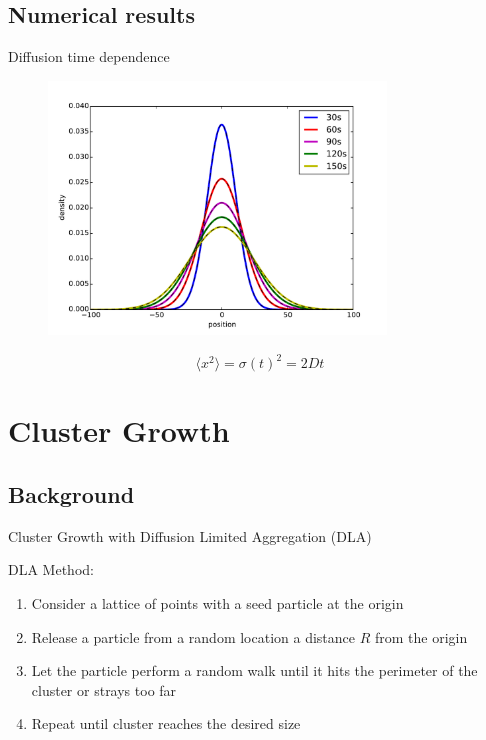 \documentclass{beamer}
\begin{document}
\subsection{Numerical results}

\begin{frame}{Diffusion time dependence}

\begin{figure}[H]
	\centering
	\includegraphics[width=0.8\textwidth]{diffusion.pdf}
\end{figure}
\begin{equation}
\langle x^2\rangle=\sigma(t)^2=2Dt
\end{equation}

\end{frame}


\section{Cluster Growth}


\subsection{Background}

\begin{frame}{Cluster Growth with Diffusion Limited Aggregation (DLA)}

DLA Method:

\begin{enumerate}

\item Consider a lattice of points with a seed particle at the origin

\item Release a particle from a random location a distance $R$ from the origin

\item Let the particle perform a random walk until it hits the perimeter of the cluster or strays too far

\item Repeat until cluster reaches the desired size
\end{enumerate}

\end{frame}
\end{document}
